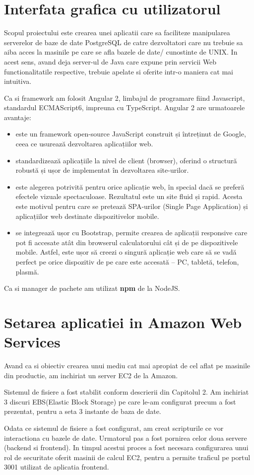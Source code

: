 \section{Interfata grafica cu utilizatorul}
Scopul proiectului este crearea unei aplicatii care sa faciliteze manipularea serverelor de baze de date PostgreSQL de catre dezvoltatori care nu trebuie sa aiba acces la masinile pe care se afla bazele de date/ cunostinte de UNIX. In acest sens, avand deja server-ul de Java care expune prin servicii Web functionalitatile respective, trebuie apelate si oferite intr-o maniera cat mai intuitiva. 
\par
Ca si framework am folosit Angular 2, limbajul de programare fiind Javascript, standardul ECMAScript6, impreuna cu TypeScript. Angular 2 are urmatoarele avantaje:
\begin{itemize}
\item este un framework open-source JavaScript construit și întreținut de Google, ceea ce usurează dezvoltarea aplicațiilor web.
\item standardizează aplicațiile la nivel de client (browser), oferind o structură robustă și ușor de implementat în dezvoltarea site-urilor.
\item este alegerea potrivită pentru orice aplicație web, în special dacă se preferă efectele vizuale spectaculoase. Rezultatul este un site fluid și rapid. Acesta este motivul pentru care se pretează SPA-urilor (Single Page Application) și aplicațiilor web destinate dispozitivelor mobile.
\item se integrează ușor cu Bootstrap, permite crearea de aplicații responsive care pot fi accesate atât din browserul calculatorului cât și de pe dispozitivele mobile. Astfel, este ușor să creezi o singură aplicație web care să se vadă perfect pe orice dispozitiv de pe care este accesată – PC, tabletă, telefon, plasmă.
\end{itemize}
\par Ca si manager de pachete am utilizat \textbf{npm} de la NodeJS.
\newpage
\section{Setarea aplicatiei in Amazon Web Services}
Avand ca si obiectiv crearea unui mediu cat mai apropiat de cel aflat pe masinile din productie, am inchiriat un server EC2 de la Amazon.
\par
Sistemul de fisiere a fost stabilit conform descrierii din Capitolul 2. Am inchiriat 3 discuri EBS(Elastic Block Storage) pe care le-am configurat precum a fost prezentat, pentru a seta 3 instante de baza de date.
\par 
Odata ce sistemul de fisiere a fost configurat, am creat scripturile ce vor interactiona cu bazele de date. Urmatorul pas a fost pornirea celor doua servere (backend si frontend). In timpul acestui proces a fost necesara configurarea unui rol de securitate oferit masinii de calcul EC2, pentru a permite traficul pe portul 3001 utilizat de aplicatia frontend.